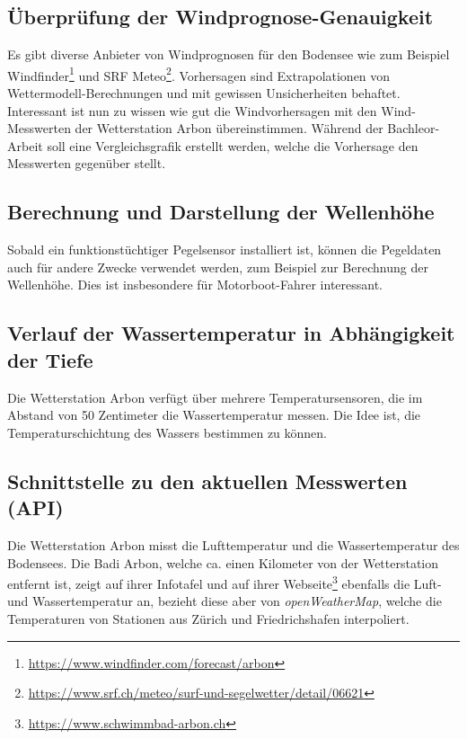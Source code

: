 \subsection{Überprüfung der Windprognose-Genauigkeit }
Es gibt diverse Anbieter von Windprognosen für den Bodensee wie zum Beispiel Windfinder\footnote{ \url{https://www.windfinder.com/forecast/arbon}} und SRF Meteo\footnote{ \url{https://www.srf.ch/meteo/surf-und-segelwetter/detail/06621}}. Vorhersagen sind Extrapolationen von Wettermodell-Berechnungen und mit gewissen Unsicherheiten behaftet. Interessant ist nun zu wissen wie gut die Windvorhersagen mit den Wind-Messwerten der Wetterstation Arbon übereinstimmen. Während der Bachleor-Arbeit soll eine Vergleichsgrafik erstellt werden, welche die Vorhersage den Messwerten gegenüber stellt.


\subsection{Berechnung und Darstellung der Wellenhöhe}
Sobald ein funktionstüchtiger Pegelsensor installiert ist, können die Pegeldaten auch für andere Zwecke verwendet werden, zum Beispiel zur Berechnung der Wellenhöhe. Dies ist insbesondere für Motorboot-Fahrer interessant.


\subsection{Verlauf der Wassertemperatur in Abhängigkeit der Tiefe}
Die Wetterstation Arbon verfügt über mehrere Temperatursensoren, die im Abstand von 50 Zentimeter die Wassertemperatur messen. Die Idee ist, die Temperaturschichtung des Wassers bestimmen zu können.


\subsection{Schnittstelle zu den aktuellen Messwerten (API)}
Die Wetterstation Arbon misst die Lufttemperatur und die Wassertemperatur des Bodensees. Die Badi Arbon, welche ca. einen Kilometer von der Wetterstation entfernt ist, zeigt auf ihrer Infotafel und auf ihrer Webseite\footnote{ \url{https://www.schwimmbad-arbon.ch}} ebenfalls die Luft- und Wassertemperatur an, bezieht diese aber von \textit{openWeatherMap}, welche die Temperaturen von Stationen aus Zürich und Friedrichshafen interpoliert. 
\newline

